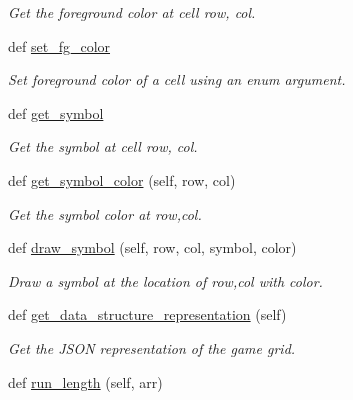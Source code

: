 \begin{DoxyCompactItemize}
\begin{DoxyCompactList}\small\item\em Get the foreground color at cell row, col. \end{DoxyCompactList}\item 
def \hyperlink{classbridges_1_1game__grid_1_1_game_grid_a9f9040a6b8b88d7d7c74194c22890047}{set\+\_\+fg\+\_\+color}
\begin{DoxyCompactList}\small\item\em Set foreground color of a cell using an enum argument. \end{DoxyCompactList}\item 
def \hyperlink{classbridges_1_1game__grid_1_1_game_grid_a03818f51e8f99ae68eb7dc6a7f74a4e7}{get\+\_\+symbol}
\begin{DoxyCompactList}\small\item\em Get the symbol at cell row, col. \end{DoxyCompactList}\item 
def \hyperlink{classbridges_1_1game__grid_1_1_game_grid_a7324c15bc6983621ed84964dde173f7f}{get\+\_\+symbol\+\_\+color} (self, row, col)
\begin{DoxyCompactList}\small\item\em Get the symbol color at row,col. \end{DoxyCompactList}\item 
def \hyperlink{classbridges_1_1game__grid_1_1_game_grid_aa7ce48d090d75c8022a8356aafad303f}{draw\+\_\+symbol} (self, row, col, symbol, color)
\begin{DoxyCompactList}\small\item\em Draw a symbol at the location of row,col with color. \end{DoxyCompactList}\item 
def \hyperlink{classbridges_1_1game__grid_1_1_game_grid_acb17afe074d5222b418e922ed5f48ed7}{get\+\_\+data\+\_\+structure\+\_\+representation} (self)
\begin{DoxyCompactList}\small\item\em Get the J\+S\+ON representation of the game grid. \end{DoxyCompactList}\item 
def \hyperlink{classbridges_1_1game__grid_1_1_game_grid_a80f0ce020baf3d5fe53cbd719fbe78e5}{run\+\_\+length} (self, arr)
\end{DoxyCompactItemize}
